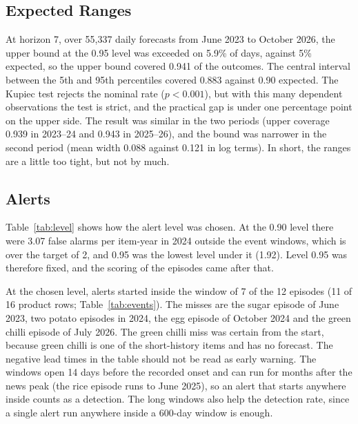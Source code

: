\subsection{Expected Ranges}
At horizon 7, over 55,337 daily forecasts from June 2023 to October 2026, the upper bound at the 0.95 level was exceeded on 5.9\% of days, against 5\% expected, so the upper bound covered 0.941 of the outcomes. The central interval between the 5th and 95th percentiles covered 0.883 against 0.90 expected. The Kupiec test rejects the nominal rate ($p<0.001$), but with this many dependent observations the test is strict, and the practical gap is under one percentage point on the upper side. The result was similar in the two periods (upper coverage 0.939 in 2023--24 and 0.943 in 2025--26), and the bound was narrower in the second period (mean width 0.088 against 0.121 in log terms). In short, the ranges are a little too tight, but not by much.

\subsection{Alerts}
Table~\ref{tab:level} shows how the alert level was chosen. At the 0.90 level there were 3.07 false alarms per item-year in 2024 outside the event windows, which is over the target of 2, and 0.95 was the lowest level under it (1.92). Level 0.95 was therefore fixed, and the scoring of the episodes came after that.

\begin{table}[H]\centering\small
\caption[Alert levels and false alarms]{Alert levels. False alarms are alert runs per item-year in 2024 outside event windows; recall and precision are over the whole period, counted by product row.}\label{tab:level}

\par{}
\end{table}

At the chosen level, alerts started inside the window of 7 of the 12 episodes (11 of 16 product rows; Table~\ref{tab:events}). The misses are the sugar episode of June 2023, two potato episodes in 2024, the egg episode of October 2024 and the green chilli episode of July 2026. The green chilli miss was certain from the start, because green chilli is one of the short-history items and has no forecast. The negative lead times in the table should not be read as early warning. The windows open 14 days before the recorded onset and can run for months after the news peak (the rice episode runs to June 2025), so an alert that starts anywhere inside counts as a detection. The long windows also help the detection rate, since a single alert run anywhere inside a 600-day window is enough.

